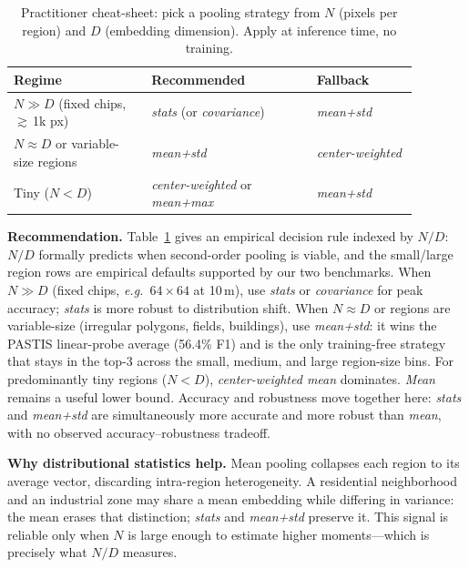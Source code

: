 \documentclass[journal]{IEEEtran}
\newcommand{\eg}{\textit{e.g.}}
\begin{document}
\begin{table}[!t]
  \centering
  \footnotesize
  \setlength{\tabcolsep}{4pt}
  \caption{Practitioner cheat-sheet: pick a pooling strategy from $N$ (pixels per region) and $D$ (embedding dimension). Apply at inference time, no training.}\label{tab:cheatsheet}
  \begin{tabular}{@{}>{\raggedright\arraybackslash}p{0.30\linewidth}>{\raggedright\arraybackslash}p{0.36\linewidth}>{\raggedright\arraybackslash}p{0.22\linewidth}@{}}
    \toprule
    Regime & Recommended & Fallback \\
    \midrule
    $N \gg D$ (fixed chips, $\gtrsim$\,1k px) & \textit{stats} (or \textit{covariance}) & \textit{mean+std} \\
    $N \approx D$ or variable-size regions & \textit{mean+std} & \textit{center-weighted} \\
    Tiny ($N < D$) & \textit{center-weighted} or \textit{mean+max} & \textit{mean+std} \\
    \bottomrule
  \end{tabular}
\end{table}

\textbf{Recommendation.} Table~\ref{tab:cheatsheet} gives an empirical decision rule indexed by $N/D$: $N/D$ formally predicts when second-order pooling is viable, and the small/large region rows are empirical defaults supported by our two benchmarks. When $N \gg D$ (fixed chips, \eg\ $64{\times}64$ at 10\,m), use \textit{stats} or \textit{covariance} for peak accuracy; \textit{stats} is more robust to distribution shift. When $N \approx D$ or regions are variable-size (irregular polygons, fields, buildings), use \textit{mean+std}: it wins the PASTIS linear-probe average (56.4\% F1) and is the only training-free strategy that stays in the top-3 across the small, medium, and large region-size bins. For predominantly tiny regions ($N{<}D$), \textit{center-weighted mean} dominates. \textit{Mean} remains a useful lower bound. Accuracy and robustness move together here: \textit{stats} and \textit{mean+std} are simultaneously more accurate and more robust than \textit{mean}, with no observed accuracy--robustness tradeoff.

\textbf{Why distributional statistics help.} Mean pooling collapses each region to its average vector, discarding intra-region heterogeneity. A residential neighborhood and an industrial zone may share a mean embedding while differing in variance: the mean erases that distinction; \textit{stats} and \textit{mean+std} preserve it. This signal is reliable only when $N$ is large enough to estimate higher moments---which is precisely what $N/D$ measures.
\end{document}
